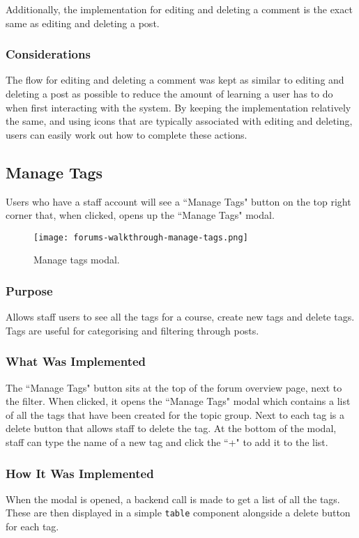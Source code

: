 Additionally, the implementation for editing and deleting a comment is the exact same as editing and deleting a post.

\subsubsection{Considerations}
The flow for editing and deleting a comment was kept as similar to editing and deleting a post as possible to reduce the amount of learning a user has to do when first interacting with the system.
By keeping the implementation relatively the same, and using icons that are typically associated with editing and deleting, users can easily work out how to complete these actions.

\subsection{Manage Tags}
Users who have a staff account will see a ``Manage Tags" button on the top right corner that, when clicked, opens up the ``Manage Tags" modal.

\begin{figure}[h!]
    \texttt{[image: forums-walkthrough-manage-tags.png]}
    \centering
    \caption{Manage tags modal.}
\end{figure}

\subsubsection{Purpose}
Allows staff users to see all the tags for a course, create new tags and delete tags.
Tags are useful for categorising and filtering through posts.

\subsubsection{What Was Implemented}
The ``Manage Tags" button sits at the top of the forum overview page, next to the filter.
When clicked, it opens the ``Manage Tags" modal which contains a list of all the tags that have been created for the topic group.
Next to each tag is a delete button that allows staff to delete the tag.
At the bottom of the modal, staff can type the name of a new tag and click the ``+" to add it to the list.

\subsubsection{How It Was Implemented}
When the modal is opened, a backend call is made to get a list of all the tags.
These are then displayed in a simple \texttt{table} component alongside a delete button for each tag.

